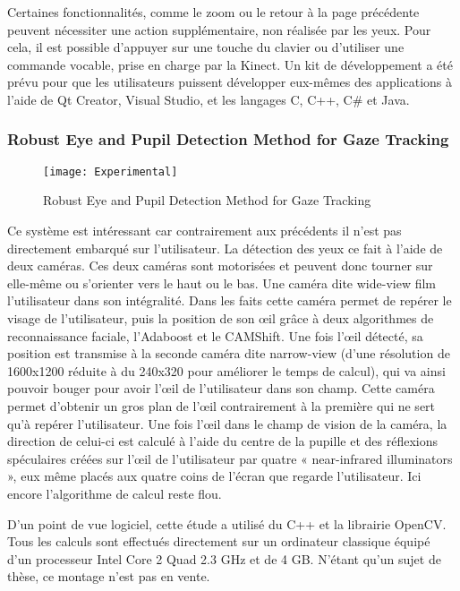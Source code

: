 Certaines fonctionnalités, comme le zoom ou le retour à la page précédente peuvent nécessiter une action supplémentaire, non réalisée par les yeux. Pour cela, il est possible d’appuyer sur une touche du clavier ou d’utiliser une commande vocable, prise en charge par la Kinect. 
Un kit de développement a été prévu pour que les utilisateurs puissent développer eux-mêmes des applications à l’aide de Qt Creator, Visual Studio, et les langages C, C++, C\# et Java. 

\subsubsection{Robust Eye and Pupil Detection Method for Gaze Tracking}

\begin{figure}[h]
  \centering
  \texttt{[image: Experimental]}
  \caption{Robust Eye and Pupil Detection Method for Gaze Tracking}
  \label{fig:Experimental}
\end{figure}

Ce système est intéressant car contrairement aux précédents il n’est pas directement embarqué sur l’utilisateur. La détection des yeux ce fait à l’aide de deux caméras. Ces deux caméras sont motorisées et peuvent donc tourner sur elle-même ou s’orienter vers le haut ou le bas. 
Une caméra dite wide-view film l’utilisateur dans son intégralité. Dans les faits cette caméra permet de repérer le visage de l’utilisateur, puis la position de son œil grâce à deux algorithmes de reconnaissance faciale, l’Adaboost et le CAMShift. Une fois l’œil détecté, sa position est transmise à la seconde caméra dite narrow-view (d’une résolution de 1600x1200 réduite à du 240x320 pour améliorer le temps de calcul), qui va ainsi pouvoir bouger pour avoir l’œil de l’utilisateur dans son champ. Cette caméra permet d’obtenir un gros plan de l’œil contrairement à la première qui ne sert qu’à repérer l’utilisateur. Une fois l’œil dans le champ de vision de la caméra, la direction de celui-ci est calculé à l’aide du centre de la pupille et des réflexions spéculaires créées sur l’œil de l’utilisateur par quatre « near-infrared illuminators », eux même placés aux quatre coins de l’écran que regarde l’utilisateur. Ici encore l’algorithme de calcul reste flou.

D’un point de vue logiciel, cette étude a utilisé du C++ et la librairie OpenCV. Tous les calculs sont effectués directement sur un ordinateur classique équipé d’un processeur Intel Core 2 Quad 2.3 GHz et de 4 GB.
N’étant qu’un sujet de thèse, ce montage n’est pas en vente.

